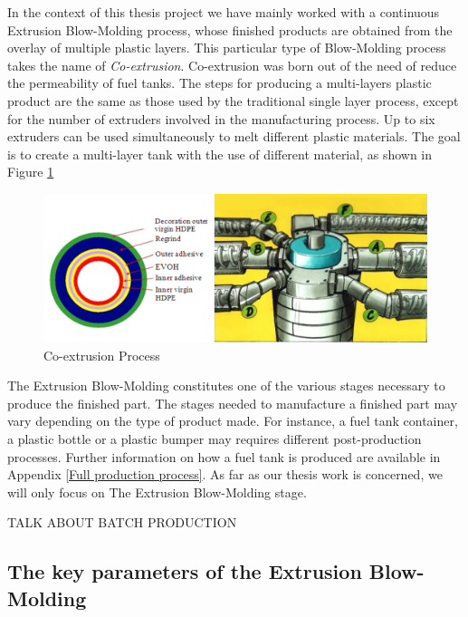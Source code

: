 In the context of this thesis project we have mainly worked with a continuous Extrusion Blow-Molding process, whose finished products are obtained from the overlay of multiple plastic layers. This particular type of Blow-Molding process takes the name of \textit{Co-extrusion}. Co-extrusion was born out of the need of reduce the permeability of fuel tanks. The steps for producing a multi-layers plastic product are the same as those used by the traditional single layer process, except for the number of extruders involved in the manufacturing process. Up to six extruders can be used simultaneously to melt different plastic materials. The goal is to create a multi-layer tank with the use of different material, as shown in
Figure \ref{fig:Co-extrusion Process}

\begin{figure}
\centerline{\includegraphics[scale=0.55]{images/chapter_1/coextrusion.png}}
\caption{Co-extrusion Process}
\label{fig:Co-extrusion Process}
\end{figure}

The Extrusion Blow-Molding constitutes one of the various stages necessary to produce the finished part. The stages needed to manufacture a finished part may vary depending on the type of product made. For instance, a fuel tank container, a plastic bottle or a plastic bumper may requires different post-production processes. Further information on how a fuel tank is produced are available in Appendix \ref{Full production process}. As far as our thesis work is concerned, we will only focus on The Extrusion Blow-Molding stage.

TALK ABOUT BATCH PRODUCTION


\subsection{The key parameters of the Extrusion Blow-Molding} \label{The key parameters of the Extrusion Blow-Molding}

